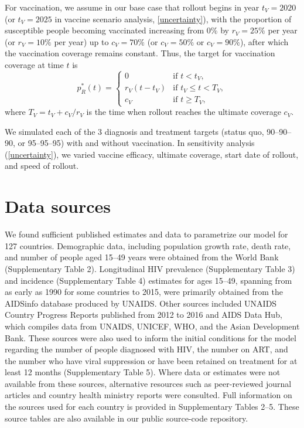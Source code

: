 \documentclass{article}
\begin{document}
For vaccination, we assume in our base case that rollout begins in
year $t_V = 2020$ (or $t_V = 2025$ in vaccine scenario analysis,
\autoref{uncertainty}), with the proportion of susceptible people
becoming vaccinated increasing from 0\% by $r_V = 25\%$ per year (or
$r_V = 10\%$ per year) up to $c_V = 70\%$ (or $c_V = 50\%$ or
$c_V = 90\%$), after which the vaccination coverage remains constant.
Thus, the target for vaccination coverage at time $t$ is
\begin{equation}
  \label{vaccination_target}
  p_R^*(t) =
  \begin{cases}
    0 & \text{if $t < t_V$},
    \\
    r_V (t - t_V) & \text{if $t_V \leq t < T_V$},
    \\
    c_V & \text{if $t \geq T_V$},
  \end{cases}
\end{equation}
where $T_V = t_V + c_V / r_V$ is the time when rollout reaches
the ultimate coverage $c_V$.

We simulated each of the 3 diagnosis and treatment targets (status
quo, 90--90--90, or 95--95--95) with and without vaccination.  In
sensitivity analysis (\autoref{uncertainty}), we varied vaccine
efficacy, ultimate coverage, start date of rollout, and speed of
rollout.


\section{Data sources}
\label{data_sources}

We found sufficient published estimates and data to parametrize our
model for 127 countries.  Demographic data, including population
growth rate,\cite{WorldBankpg} death
rate,\cite{World_Development_Indicators2013-ee} and number of people
aged 15--49 years\cite{The_World_Bank2016-fd} were obtained from the
World Bank (Supplementary Table 2). Longitudinal HIV prevalence
(Supplementary Table 3) and incidence (Supplementary Table 4)
estimates for ages 15--49, spanning from as early as 1990 for some
countries to 2015, were primarily obtained from the AIDSinfo database
produced by UNAIDS.\cite{Unaids2016-an} Other sources included UNAIDS
Country Progress Reports\cite{Unaids2016-am} published from 2012 to
2016 and AIDS Data Hub,\cite{AIDSdatahub-fg} which compiles data from
UNAIDS, UNICEF, WHO, and the Asian Development Bank.  These sources
were also used to inform the initial conditions for the model
regarding the number of people diagnosed with HIV, the number on ART,
and the number who have viral suppression or have been retained on
treatment for at least 12 months (Supplementary Table 5).  Where data
or estimates were not available from these sources, alternative
resources such as peer-reviewed journal articles and country health
ministry reports were consulted.  Full information on the sources used
for each country is provided in Supplementary Tables 2--5.  These
source tables are also available in our public source-code
repository.\cite{medlock2016-git}
\end{document}
